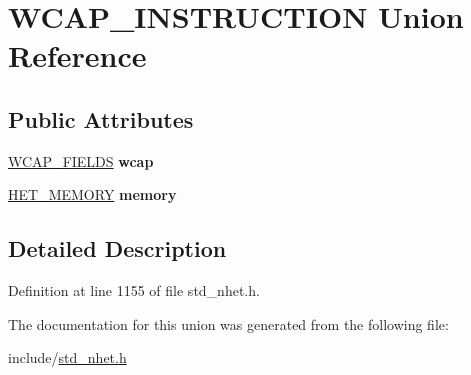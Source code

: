 \hypertarget{unionWCAP__INSTRUCTION}{}\section{W\+C\+A\+P\+\_\+\+I\+N\+S\+T\+R\+U\+C\+T\+I\+ON Union Reference}
\label{unionWCAP__INSTRUCTION}
\subsection*{Public Attributes}
\begin{DoxyCompactItemize}
\item 
\mbox{\label{unionWCAP__INSTRUCTION_ae365c1e5aaa2c0a3e38db88a323b6984}} 
\mbox{\hyperlink{structwcap__format}{W\+C\+A\+P\+\_\+\+F\+I\+E\+L\+DS}} {\bfseries wcap}
\item 
\mbox{\label{unionWCAP__INSTRUCTION_ad7bd6481887bfff1600c52d7d5162dbf}} 
\mbox{\hyperlink{structmemory__format}{H\+E\+T\+\_\+\+M\+E\+M\+O\+RY}} {\bfseries memory}
\end{DoxyCompactItemize}


\subsection{Detailed Description}


Definition at line 1155 of file std\+\_\+nhet.\+h.



The documentation for this union was generated from the following file\+:\begin{DoxyCompactItemize}
\item 
include/\mbox{\hyperlink{std__nhet_8h}{std\+\_\+nhet.\+h}}\end{DoxyCompactItemize}
